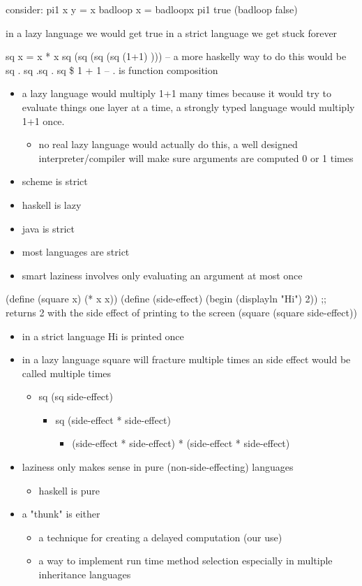 \documentclass[11pt]{article}
\begin{document}
consider:
pi1 x y = x
badloop x = badloopx
pi1 true (badloop false)

in a lazy language we would get true in a strict language we get stuck forever

sq x = x * x
sq (sq (sq (sq (1+1) )))
-- a more haskelly way to do this would be
sq . sq .sq . sq \$ 1 + 1
-- . is function composition

\begin{itemize}
\item a lazy language would multiply 1+1 many times because it would try to evaluate things one layer at a 
time, a strongly typed language would multiply 1+1 once.
\begin{itemize}
\item no real lazy language would actually do this, a well designed interpreter/compiler will make sure 
arguments are computed 0 or 1 times
\end{itemize}

\item scheme is strict
\item haskell is lazy
\item java is strict
\item most languages are strict
\item smart laziness involves only evaluating an argument at most once
\end{itemize}

(define (square x) (* x x))
(define (side-effect)
    (begin
    (displayln "Hi")
    2)) ;; returns 2 with the side effect of printing to the screen
(square (square side-effect))

\begin{itemize}
\item in a strict language Hi is printed once
\item in a lazy language square will fracture multiple times an side effect would be called multiple times
\begin{itemize}
\item sq (sq side-effect)
\begin{itemize}
\item sq (side-effect * side-effect)
\begin{itemize}
\item (side-effect * side-effect) * (side-effect * side-effect)
\end{itemize}
\end{itemize}
\end{itemize}
\item laziness only makes sense in pure (non-side-effecting) languages
\begin{itemize}
\item haskell is pure
\end{itemize}
\item a "thunk" is either
\begin{itemize}
\item a technique for creating a delayed computation (our use)
\item a way to implement run time method selection especially in multiple inheritance languages
\end{itemize}
\end{itemize}
\end{document}
